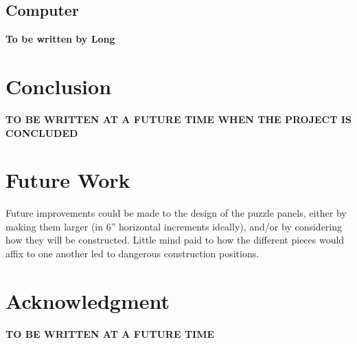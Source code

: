 \documentclass[conference]{IEEEtran}
\begin{document}
	\subsection{Computer}
	\textbf{To be written by Long}

\section{Conclusion}
	\textbf{TO BE WRITTEN AT A FUTURE TIME WHEN THE PROJECT IS CONCLUDED}

\section{Future Work}
Future improvements could be made to the design of the puzzle panels, either by making them larger (in 6'' horizontal increments ideally), and/or by considering how they will be constructed. Little mind paid to how the different pieces would affix to one another led to dangerous construction positions.

\section*{Acknowledgment} 
	\textbf{TO BE WRITTEN AT A FUTURE TIME}
\end{document}
